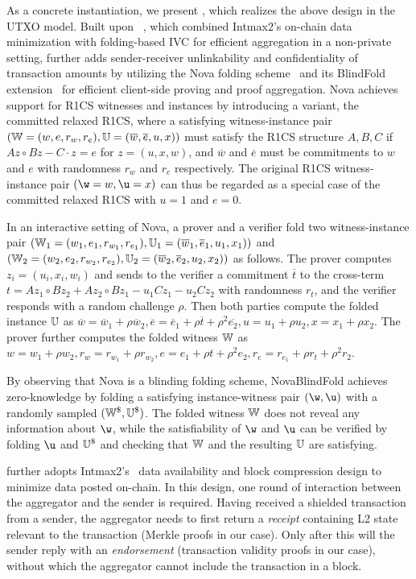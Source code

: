 As a concrete instantiation, we present \Protocol, which realizes the above design in the \ac{UTXO} model.
Built upon \PlasmaFold~\cite{cryptoeprint:2025/1300}, which combined Intmax2's on-chain data minimization with folding-based \ac{IVC} for efficient aggregation in a non-private setting, \Protocol further adds sender-receiver unlinkability and confidentiality of transaction amounts by utilizing the Nova folding scheme~\cite{C:KotSetTzi22} and its BlindFold extension~\cite{C:KotSet24} for efficient client-side proving and proof aggregation.
Nova achieves support for \ac{R1CS} witnesses and instances by introducing a variant, the committed relaxed \ac{R1CS}, where a satisfying witness-instance pair $({\mathbb{W}} = (w, e, r_w, r_e), {\mathbb{U}} = (\overline{w}, \overline{e}, u, x))$ must satisfy the R1CS structure $A, B, C$ if $A z \circ B z - C \cdot z = e$ for $z = (u, x, w)$, and $\overline{w}$ and $\overline{e}$ must be commitments to $w$ and $e$ with randomness $r_w$ and $r_e$ respectively.
The original R1CS witness-instance pair $(\w = w, \u = x)$ can thus be regarded as a special case of the committed relaxed R1CS with $u = 1$ and $e = 0$.

In an interactive setting of Nova, a prover and a verifier fold two witness-instance pair $({\mathbb{W}}_1 = (w_1, e_1, r_{w_1}, r_{e_1}), {\mathbb{U}}_1 = (\overline{w}_1, \overline{e}_1, u_1, x_1))$ and $({\mathbb{W}}_2 = (w_2, e_2, r_{w_2}, r_{e_2}), {\mathbb{U}}_2 = (\overline{w}_2, \overline{e}_2, u_2, x_2))$ as follows.
The prover computes $z_i = (u_i, x_i, w_i)$ and sends to the verifier a commitment $\overline{t}$ to the cross-term $t = A z_1 \circ B z_2 + A z_2 \circ B z_1 - u_1 C z_1 - u_2 C z_2$ with randomness $r_t$, and the verifier responds with a random challenge $\rho$.
Then both parties compute the folded instance ${\mathbb{U}}$ as $\overline{w} = \overline{w}_1 + \rho \overline{w}_2, \overline{e} = \overline{e}_1 + \rho \overline{t} + \rho^2 \overline{e_2}, u = u_1 + \rho u_2, x = x_1 + \rho x_2$.
The prover further computes the folded witness ${\mathbb{W}}$ as $w = w_1 + \rho w_2, r_w = r_{w_1} + \rho r_{w_2}, e = e_1 + \rho t+ \rho^2 e_2, r_e = r_{e_1} + \rho r_t + \rho^2 r_2$.

By observing that Nova is a blinding folding scheme, NovaBlindFold achieves zero-knowledge by folding a satisfying instance-witness pair $(\w, \u)$ with a randomly sampled $({\mathbb{W}}^\$, {\mathbb{U}}^\$)$.
The folded witness ${\mathbb{W}}$ does not reveal any information about $\w$, while the satisfiability of $\w$ and $\u$ can be verified by folding $\u$ and $\U^\$ $ and checking that ${\mathbb{W}}$ and the resulting ${\mathbb{U}}$ are satisfying.


\Protocol further adopts Intmax2's~\cite{cryptoeprint:2023/1082} data availability and block compression design to minimize data posted on-chain.
In this design, one round of interaction between the aggregator and the sender is required.
Having received a shielded transaction from a sender, the aggregator needs to first return a \textit{receipt} containing \ac{L2} state relevant to the transaction (Merkle proofs in our case).
Only after this will the sender reply with an \textit{endorsement} (transaction validity proofs in our case), without which the aggregator cannot include the transaction in a block.
